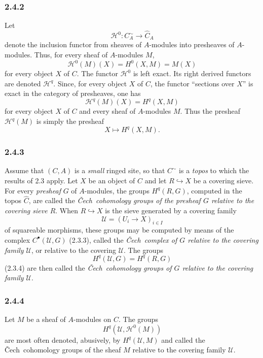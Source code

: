 \documentclass[11pt]{article}
\newcommand{\Cech}{\v{C}ech}
\newcommand{\Hh}{\mathcal{H}}
\begin{document}
\subsubsection*{2.4.2}
Let
\[
\Hh^0:C^\sim_A\longrightarrow \widehat C_A
\]
denote the inclusion functor from sheaves of $A$-modules into presheaves of $A$-modules. Thus, for every sheaf of $A$-modules $M$,
\[
\Hh^0(M)(X)=H^0(X,M)=M(X)
\tag{2.4.2.1}
\]
for every object $X$ of $C$. The functor $\Hh^0$ is left exact. Its right derived functors are denoted $\Hh^q$. Since, for every object $X$ of $C$, the functor ``sections over $X$'' is exact in the category of presheaves, one has
\[
\Hh^q(M)(X)=H^q(X,M)
\tag{2.4.2.2}
\]
for every object $X$ of $C$ and every sheaf of $A$-modules $M$. Thus the presheaf $\Hh^q(M)$ is simply the presheaf
\[
X\longmapsto H^q(X,M).
\]

\subsubsection*{2.4.3}
Assume that $(C,A)$ is a \emph{small} ringed site, so that $C^\sim$ is a \emph{topos} to which the results of 2.3 apply. Let $X$ be an object of $C$ and let $R\hookrightarrow X$ be a covering sieve. For every \emph{presheaf} $G$ of $A$-modules, the groups $H^q(R,G)$, computed in the topos $\widehat C$, are called the \emph{\Cech\ cohomology groups of the presheaf $G$ relative to the covering sieve $R$}. When $R\hookrightarrow X$ is the sieve generated by a covering family
\[
\mathcal U=(U_i\to X)_{i\in I}
\]
of squareable morphisms, these groups may be computed by means of the complex $C^\bullet(\mathcal U,G)$ (2.3.3), called the \emph{\Cech\ complex of $G$ relative to the covering family $\mathcal U$}, or relative to the covering $\mathcal U$. The groups
\[
H^q(\mathcal U,G)=H^q(R,G)
\]
(2.3.4) are then called the \emph{\Cech\ cohomology groups of $G$ relative to the covering family $\mathcal U$}.

\subsubsection*{2.4.4}
Let $M$ be a sheaf of $A$-modules on $C$. The groups
\[
H^q(\mathcal U,\Hh^0(M))
\]
are most often denoted, abusively, by $H^q(\mathcal U,M)$ and called the \Cech\ cohomology groups of the sheaf $M$ relative to the covering family $\mathcal U$.
\end{document}
